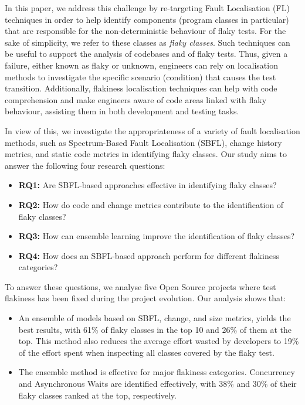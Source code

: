 In this paper, we address this challenge by re-targeting Fault Localisation (FL) techniques in order to help identify components (program classes in particular) that are responsible for the non-deterministic behaviour of flaky tests. For the sake of simplicity, we refer to these classes as \textit{flaky classes}. Such techniques can be useful to support the analysis  of codebases and of flaky tests. Thus, given a failure, either known as flaky or unknown, engineers can rely on localisation methods to investigate the specific scenario (condition) that causes the test transition. Additionally, flakiness localisation techniques can help with code comprehension and make engineers aware of code areas linked with flaky behaviour, assisting them in both development and testing tasks. 

In view of this, we investigate the appropriateness of a variety of fault localisation methods, such as Spectrum-Based Fault Localisation (SBFL), change history metrics, and static code metrics in identifying flaky classes. 
Our study aims to answer the following four research questions:

\begin{itemize}%
    \item \textbf{\textsc{RQ1:}} Are SBFL-based approaches effective in identifying flaky classes?
    \item \textbf{\textsc{RQ2:}} How do code and change metrics contribute to the identification of flaky classes?
    \item \textbf{\textsc{RQ3:}} How can ensemble learning improve the identification of flaky classes?
    \item \textbf{\textsc{RQ4:}} How does an SBFL-based approach perform for different flakiness categories?
\end{itemize}

To answer these questions, we analyse five Open Source projects where test flakiness has been fixed during the project evolution. Our analysis shows that: 
\begin{itemize}
    \item An ensemble of models based on SBFL, change, and size metrics, yields the best results, with 61\% of flaky classes in the top 10 and 26\% of them at the top. 
    This method also reduces the average effort wasted by developers to 19\% of the effort spent when inspecting all classes covered by the flaky test.
    \item The ensemble method is effective for major flakiness categories. Concurrency and Asynchronous Waits are identified effectively, with 38\% and 30\% of their flaky classes ranked at the top, respectively.
\end{itemize}
    
